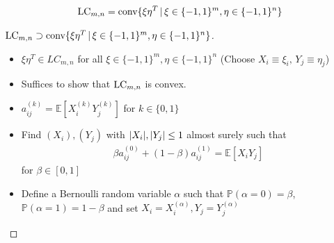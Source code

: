 \begin{frame}
	\begin{lemma}
		\begin{align*}
		\textup{LC}_{m,n} = \textup{conv} \{  \xi\eta^T \, | \, \xi \in \{-1,1\}^m, \eta \in \{-1,1\}^n     \}
		\end{align*}
		
	\end{lemma}
	\begin{proof}[$   \textup{LC}_{m,n}  \supset \textup{conv} \{  \xi\eta^T \, | \, \xi \in \{-1,1\}^m, \eta \in \{-1,1\}^n     \} $]
		\pause
		\begin{itemize}
			\item $ \xi \eta^T \in LC_{m,n}  $ for all $\xi \in \{-1,1\}^m, \eta \in \{-1,1\}^n   $ (Choose $ X_i \equiv \xi_i, \, Y_j \equiv \eta_j $)
			\pause
			\item Suffices to show that $ \textup{LC}_{m,n} $ is convex. 
			\item $ a_{ij}^{(k)} = \mathbb{E}[X_i^{(k)}Y_{j}^{(k)}] $ for $ k \in \{0,1\} $
			\item Find $ (X_i),(Y_j) $ with $ {\left|{X_i}\right|},{\left|{Y_j}\right|} \le 1 $ almost surely such that
			\begin{align*}
			\beta a_{ij}^{(0)}+ (1-\beta)a_{ij}^{(1)} = \mathbb{E}[X_iY_j]
			\end{align*}
			for $ \beta \in [0,1] $
			\pause
			\item Define a Bernoulli random variable $ \alpha $ such that $ \mathbb{P}(\alpha = 0) = \beta $, $ \mathbb{P}(\alpha = 1) = 1 - \beta$ and set $ X_i = X_i^{(\alpha)}, Y_j = Y_j^{(\alpha)} $
		\end{itemize}
	\end{proof}
\end{frame}

